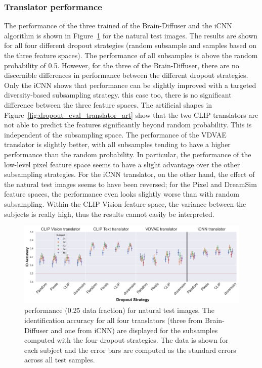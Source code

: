 \subsubsection{Translator performance}
The performance of the three trained  of the Brain-Diffuser and the iCNN algorithm is shown in Figure~\ref{fig:dropout_eval_translator_test} for the natural test images. The results are shown for all four different dropout strategies (random subsample and samples based on the three feature spaces). The performance of all subsamples is above the random probability of 0.5. However, for the three  of the Brain-Diffuser, there are no discernible differences in performance between the different dropout strategies. Only the iCNN  shows that performance can be slightly improved with a targeted diversity-based subsampling strategy.  this case too, there is no significant difference between the three feature spaces. The artificial shapes in Figure~\ref{fig:dropout_eval_translator_art} show that the two CLIP translators are not able to predict the features significantly beyond random probability. This is independent of the subsampling space. The performance of the VDVAE translator is slightly better, with all subsamples tending to have a higher performance than the random probability. In particular, the performance of the low-level pixel feature space seems to have a slight advantage over the other subsampling strategies. For the iCNN translator, on the other hand, the effect of the natural test images seems to have been reversed; for the Pixel and DreamSim feature spaces, the performance even looks slightly worse than with random subsampling. Within the CLIP Vision feature space, the variance between the subjects is really high, thus the results cannot easily be interpreted.

\begin{figure}[ht]
  \centering
  \includegraphics[width=1\textwidth]{plots/dropout_eval_translator_test.png}
  \caption[Experiment 1: Translator performance for natural test images]{ performance (0.25 data fraction) for natural test images. The identification accuracy for all four translators (three from Brain-Diffuser and one from iCNN) are displayed for the subsamples computed with the four dropout strategies. The data is shown for each subject and the error bars are computed as the standard errors across all test samples.}\label{fig:dropout_eval_translator_test}
\end{figure}



